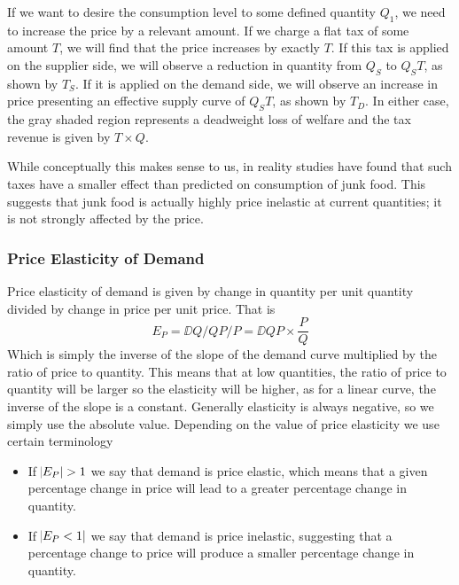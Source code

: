 \documentclass[12pt]{report}
\begin{document}
\begin{flushleft}
If we want to desire the consumption level to some defined quantity \(Q_1\), we
need to increase the price by a relevant amount. If we charge a flat tax of some
amount \(T\), we will find that the price increases by exactly \(T\). If this
tax is applied on the supplier side, we will observe a reduction in quantity
from \(Q_S\) to \(Q_ST\), as shown by \(T_S\). If it is applied on the demand
side, we will observe an increase in price presenting an effective supply curve
of \(Q_ST\), as shown by \(T_D\). In either case, the gray shaded region
represents a deadweight loss of welfare and the tax revenue is given by
\(T \times Q\). \par
While conceptually this makes sense to us, in reality studies have found that
such taxes have a smaller effect than predicted on consumption of junk food.
This suggests that junk food is actually highly price inelastic at current
quantities; it is not strongly affected by the price.

\subsubsection*{Price Elasticity of Demand}
Price elasticity of demand is given by change in quantity per unit quantity
divided by change in price per unit price. That is
\[E_P = \DD{Q / Q}{P / P} = \DD{Q}{P} \times \frac{P}{Q}\]
Which is simply the inverse of the slope of the demand curve multiplied by the
ratio of price to quantity. This means that at low quantities, the ratio of
price to quantity will be larger so the elasticity will be higher, as for a
linear curve, the inverse of the slope is a constant. Generally elasticity is
always negative, so we simply use the absolute value. Depending on the value of
price elasticity we use certain terminology
\begin{itemize}
    \item If \(\abs{E_P} > 1\) we say that demand is price elastic, which means
        that a given percentage change in price will lead to a greater
        percentage change in quantity.
    \item If \(\abs{E_P < 1}\) we say that demand is price inelastic, suggesting
        that a percentage change to price will produce a smaller percentage
        change in quantity.
\end{itemize}


\end{flushleft}
\end{document}
